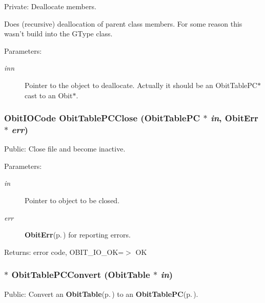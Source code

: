 Private: Deallocate members. 

Does (recursive) deallocation of parent class members. For some reason this wasn't build into the GType class. \begin{Desc}
\item[Parameters:]
\begin{description}
\item[{\em inn}]Pointer to the object to deallocate. Actually it should be an Obit\-Table\-PC$\ast$ cast to an Obit$\ast$. \end{description}
\end{Desc}
\subsubsection{\setlength{\rightskip}{0pt plus 5cm}Obit\-IOCode Obit\-Table\-PCClose ({\bf Obit\-Table\-PC} $\ast$ {\em in}, {\bf Obit\-Err} $\ast$ {\em err})}\label{ObitTablePC_8c_a25}


Public: Close file and become inactive. 

\begin{Desc}
\item[Parameters:]
\begin{description}
\item[{\em in}]Pointer to object to be closed. \item[{\em err}]{\bf Obit\-Err}{\rm (p.\,\pageref{structObitErr})} for reporting errors. \end{description}
\end{Desc}
\begin{Desc}
\item[Returns:]error code, OBIT\_\-IO\_\-OK=$>$ OK \end{Desc}
\subsubsection{$\ast$ Obit\-Table\-PCConvert ({\bf Obit\-Table} $\ast$ {\em in})}\label{ObitTablePC_8c_a19}


Public: Convert an {\bf Obit\-Table}{\rm (p.\,\pageref{structObitTable})} to an {\bf Obit\-Table\-PC}{\rm (p.\,\pageref{structObitTablePC})}. 

